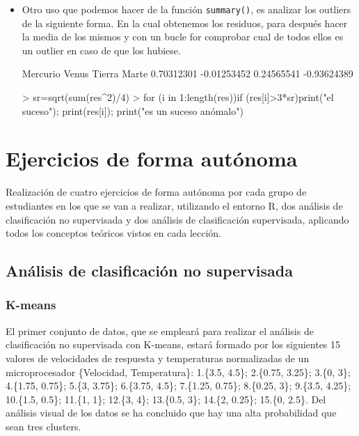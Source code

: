 \documentclass[a4paper, 12pt]{article}
\begin{document}
\begin{itemize}
    	  \item Otro uso que podemos hacer de la función \texttt{summary()}, es analizar los outliers de la siguiente forma. En la cual obtenemos los residuos, para después hacer la media de los mismos y con un bucle for comprobar cual de todos ellos es un outlier en caso de que los hubiese.
\begin{Schunk}
\begin{Soutput}
   Mercurio       Venus      Tierra       Marte 
 0.70312301 -0.01253452  0.24565541 -0.93624389 
\end{Soutput}
\begin{Sinput}
> sr=sqrt(sum(res^2)/4)
> for (i in 1:length(res)){if (res[i]>3*sr){print("el suceso"); print(res[i]); print("es un suceso anómalo")}}
\end{Sinput}
\end{Schunk}
    
  	\end{itemize}
	
	\newpage
	
	\section{Ejercicios de forma autónoma}
	
	Realización de cuatro ejercicios de forma autónoma por cada grupo de estudiantes en los que se van a realizar, utilizando el entorno R, dos análisis de clasificación no supervisada y dos análisis de clasificación supervisada, aplicando todos los conceptos teóricos vistos en cada lección.
	
	\subsection{Análisis de clasificación no supervisada}
	
	\subsubsection{K-means}
	
	El primer conjunto de datos, que se empleará para realizar el análisis de clasificación no supervisada con K-means, estará formado por los siguientes 15 valores de velocidades de respuesta y temperaturas normalizadas de un microprocesador \{Velocidad, Temperatura\}: 1.\{3.5, 4.5\}; 2.\{0.75, 3.25\}; 3.\{0, 3\}; 4.\{1.75, 0.75\}; 5.\{3, 3.75\}; 6.\{3.75, 4.5\}; 7.\{1.25, 0.75\}; 8.\{0.25, 3\}; 9.\{3.5, 4.25\}; 10.\{1.5, 0.5\}; 11.\{1, 1\}; 12.\{3, 4\}; 13.\{0.5, 3\}; 14.\{2, 0.25\}; 15.\{0, 2.5\}. Del análisis visual de los datos se ha concluido que hay una alta probabilidad que sean tres clusters.
	
\end{document}
